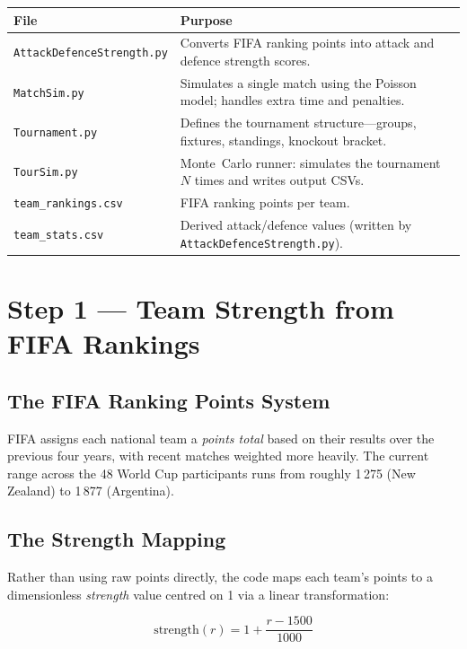 \documentclass[12pt,a4paper]{article}
\begin{document}
\begin{center}
\begin{tabular}{lp{9cm}}
\toprule
\textbf{File} & \textbf{Purpose} \\
\midrule
\texttt{AttackDefenceStrength.py} & Converts FIFA ranking points into
attack and defence strength scores. \\
\texttt{MatchSim.py} & Simulates a single match using the Poisson
model; handles extra time and penalties. \\
\texttt{Tournament.py} & Defines the tournament structure---groups,
fixtures, standings, knockout bracket. \\
\texttt{TourSim.py} & Monte~Carlo runner: simulates the tournament
$N$ times and writes output CSVs. \\
\midrule
\texttt{team\_rankings.csv} & FIFA ranking points per team. \\
\texttt{team\_stats.csv} & Derived attack/defence values (written by
\texttt{AttackDefenceStrength.py}). \\
\bottomrule
\end{tabular}
\end{center}

\section{Step 1 --- Team Strength from FIFA Rankings}
\label{sec:strength}

\subsection{The FIFA Ranking Points System}

FIFA assigns each national team a \emph{points total} based on their
results over the previous four years, with recent matches weighted more
heavily.  The current range across the 48 World Cup participants runs
from roughly 1\,275 (New Zealand) to 1\,877 (Argentina).

\subsection{The Strength Mapping}

Rather than using raw points directly, the code maps each team's points
to a dimensionless \emph{strength} value centred on 1 via a linear
transformation:

\begin{equation}
  \text{strength}(r) = 1 + \frac{r - 1500}{1000}
  \label{eq:strength}
\end{equation}
\end{document}
